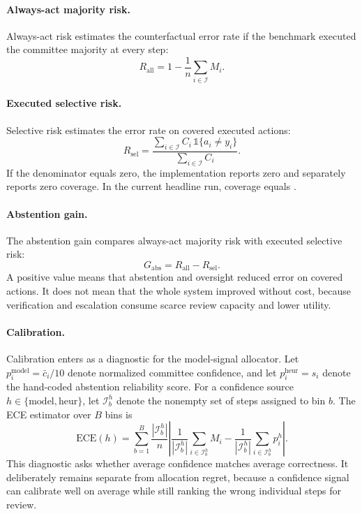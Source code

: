 \documentclass[10pt,twocolumn]{article}
\newcommand{\indicator}{\mathbb{1}}
\newcommand{\I}{\mathcal{I}}
\newcommand{\Rsel}{R_{\mathrm{sel}}}
\newcommand{\Rall}{R_{\mathrm{all}}}
\newcommand{\ECE}{\mathrm{ECE}}
\begin{document}
\paragraph{Always-act majority risk.}
Always-act risk estimates the counterfactual error rate if the benchmark executed the committee majority at every step:
\begin{equation}
\Rall = 1 - \frac{1}{n}\sum_{i\in\I} M_i.
\label{eq:always-act}
\end{equation}

\paragraph{Executed selective risk.}
Selective risk estimates the error rate on covered executed actions:
\begin{equation}
\Rsel =
\frac{\sum_{i\in\I} C_i\,\indicator\{a_i\neq y_i\}}
{\sum_{i\in\I} C_i}.
\label{eq:selective-risk}
\end{equation}
If the denominator equals zero, the implementation reports zero and separately reports zero coverage. In the current headline run, coverage equals \SMUExecutedCoverage{}.

\paragraph{Abstention gain.}
The abstention gain compares always-act majority risk with executed selective risk:
\begin{equation}
G_{\mathrm{abs}} = \Rall - \Rsel.
\label{eq:abstention-gain}
\end{equation}
A positive value means that abstention and oversight reduced error on covered actions. It does not mean that the whole system improved without cost, because verification and escalation consume scarce review capacity and lower utility.

\paragraph{Calibration.}
Calibration enters as a diagnostic for the model-signal allocator. Let \(p_i^{\mathrm{model}}=\bar c_i/10\) denote normalized committee confidence, and let \(p_i^{\mathrm{heur}}=s_i\) denote the hand-coded abstention reliability score. For a confidence source \(h\in\{\mathrm{model},\mathrm{heur}\}\), let \(\I_b^h\) denote the nonempty set of steps assigned to bin \(b\). The ECE estimator over \(B\) bins is
\begin{equation}
\ECE(h) = \sum_{b=1}^{B}\frac{|\I_b^{h}|}{n}
\left|
\frac{1}{|\I_b^{h}|}\sum_{i\in\I_b^{h}}M_i
-
\frac{1}{|\I_b^{h}|}\sum_{i\in\I_b^{h}}p_i^{h}
\right|.
\label{eq:ece}
\end{equation}
This diagnostic asks whether average confidence matches average correctness. It deliberately remains separate from allocation regret, because a confidence signal can calibrate well on average while still ranking the wrong individual steps for review.
\end{document}
